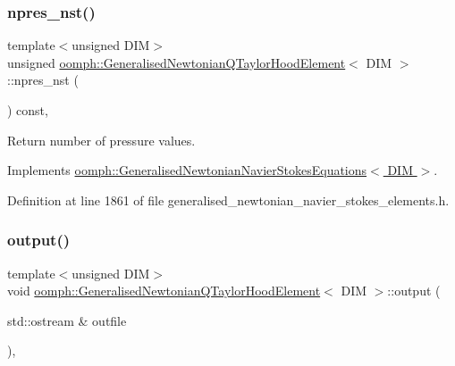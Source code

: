 \subsubsection{\texorpdfstring{npres\+\_\+nst()}{npres\_nst()}}
{\footnotesize\ttfamily template$<$unsigned D\+IM$>$ \\
unsigned \hyperlink{classoomph_1_1GeneralisedNewtonianQTaylorHoodElement}{oomph\+::\+Generalised\+Newtonian\+Q\+Taylor\+Hood\+Element}$<$ D\+IM $>$\+::npres\+\_\+nst (\begin{DoxyParamCaption}{ }\end{DoxyParamCaption}) const\hspace{0.3cm}{\ttfamily [inline]}, {\ttfamily [virtual]}}



Return number of pressure values. 



Implements \hyperlink{classoomph_1_1GeneralisedNewtonianNavierStokesEquations_ad25a5d1b7a7e7cf128b9154f08739824}{oomph\+::\+Generalised\+Newtonian\+Navier\+Stokes\+Equations$<$ D\+I\+M $>$}.



Definition at line 1861 of file generalised\+\_\+newtonian\+\_\+navier\+\_\+stokes\+\_\+elements.\+h.

\mbox{\label{classoomph_1_1GeneralisedNewtonianQTaylorHoodElement_ac1e132d67adcf473addf1d85eabd1e1c}} 
\subsubsection{\texorpdfstring{output()}{output()}\hspace{0.1cm}{\footnotesize\ttfamily [1/4]}}
{\footnotesize\ttfamily template$<$unsigned D\+IM$>$ \\
void \hyperlink{classoomph_1_1GeneralisedNewtonianQTaylorHoodElement}{oomph\+::\+Generalised\+Newtonian\+Q\+Taylor\+Hood\+Element}$<$ D\+IM $>$\+::output (\begin{DoxyParamCaption}\item[{std\+::ostream \&}]{outfile }\end{DoxyParamCaption})\hspace{0.3cm}{\ttfamily [inline]}, {\ttfamily [virtual]}}



